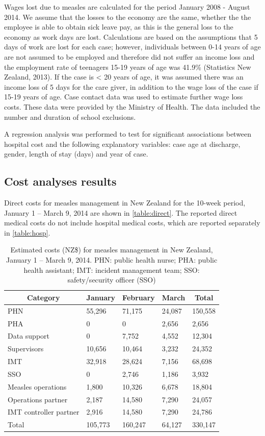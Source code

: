 \documentclass{article}
\begin{document}
Wages lost due to measles are calculated for the period January 2008 - August 2014. We assume that the losses to the economy are the same, whether the the employee is able to obtain sick leave pay, as this is the general loss to the economy as work days are lost. Calculations are based on the assumptions that 5 days of work are lost for each case; however, individuals between 0-14 years of age are not assumed to be employed and therefore did not suffer an income loss and the employment rate of teenagers 15-19 years of age was 41.9\%  (Statistics New Zealand, 2013). If the case is < 20 years of age, it was assumed there was an income loss of 5 days for the care giver, in addition to the wage loss of the case if 15-19 years of age.  Case contact data was used to estimate further wage loss costs. These data were provided by the Ministry of Health. The data included the number and duration of school exclusions.

A regression analysis was performed to test for significant associations between hospital cost and the following explanatory variables: case age at discharge, gender, length of stay (days) and year of case.

\subsection{Cost analyses results}
\label{sub:cost_res}

Direct costs for measles management in New Zealand for the 10-week period, January 1 -- March 9, 2014 are shown in  \autoref{table:direct}. The reported direct medical costs do not include hospital medical costs, which are reported separately in \autoref{table:hosp}. 

\begin{table}
\begin{center}
\begin{tabular}{lllll}
\hline\hline
\multicolumn{1}{c}{Category}&\multicolumn{1}{c}{January}&\multicolumn{1}{c}{February}&\multicolumn{1}{c}{March}&\multicolumn{1}{c}{Total}\tabularnewline
\hline
PHN&55,296&71,175&24,087&150,558\tabularnewline
PHA&0&0&2,656&2,656\tabularnewline
Data support&0&7,752&4,552&12,304\tabularnewline
Supervisors&10,656&10,464&3,232&24,352\tabularnewline
IMT&32,918&28,624&7,156&68,698\tabularnewline
SSO&0&2,746&1,186&3,932\tabularnewline
Measles operations&1,800&10,326&6,678&18,804\tabularnewline
Operations partner&2,187&14,580&7,290&24,057\tabularnewline
IMT controller partner&2,916&14,580&7,290&24,786\tabularnewline
Total&105,773&160,247&64,127&330,147\tabularnewline
\hline
\end{tabular}\end{center}\caption{Estimated costs (NZ\$) for measles management in New Zealand, January 1 -- March 9, 2014. PHN: public health nurse; PHA: public health assistant; IMT: incident management team; SSO: safety/security officer (SSO)}
\label{table:direct}
\end{table}
\end{document}
